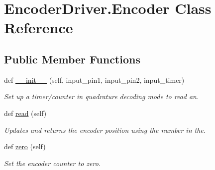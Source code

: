 \hypertarget{classEncoderDriver_1_1Encoder}{}\section{Encoder\+Driver.\+Encoder Class Reference}
\label{classEncoderDriver_1_1Encoder}
\subsection*{Public Member Functions}
\begin{DoxyCompactItemize}
\item 
def \mbox{\hyperlink{classEncoderDriver_1_1Encoder_a5699cf699993f343adc3ad1c9b507157}{\+\_\+\+\_\+init\+\_\+\+\_\+}} (self, input\+\_\+pin1, input\+\_\+pin2, input\+\_\+timer)
\begin{DoxyCompactList}\small\item\em Set up a timer/counter in quadrature decoding mode to read an. \end{DoxyCompactList}\item 
def \mbox{\hyperlink{classEncoderDriver_1_1Encoder_a747368663b8d839634c7fe286b19e789}{read}} (self)
\begin{DoxyCompactList}\small\item\em Updates and returns the encoder position using the number in the. \end{DoxyCompactList}\item 
def \mbox{\hyperlink{classEncoderDriver_1_1Encoder_a6aafe0d52333d0d1facf1e79747c96db}{zero}} (self)
\begin{DoxyCompactList}\small\item\em Set the encoder counter to zero. \end{DoxyCompactList}\end{DoxyCompactItemize}
